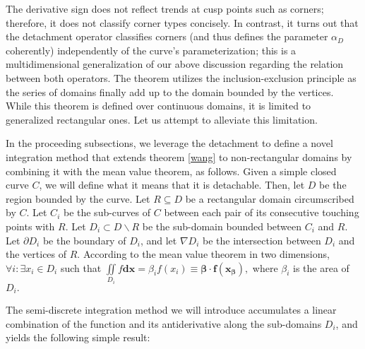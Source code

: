 \documentclass[11pt]{book}
\begin{document}
The derivative sign does not reflect trends at cusp points such as corners; therefore, it does not classify corner types concisely. In contrast, it turns out that the detachment operator classifies corners (and thus defines the parameter $\alpha_{D}$ coherently) independently of the curve’s parameterization; this is a multidimensional generalization of our above discussion regarding the relation between both operators. The theorem utilizes the inclusion-exclusion principle as the series of domains finally add up to the domain bounded by the vertices. While this theorem is defined over continuous domains, it is limited to generalized rectangular ones. Let us attempt to alleviate this limitation.

In the proceeding subsections, we leverage the detachment to define a novel integration method that extends theorem \ref{wang} to non-rectangular domains by combining it with the mean value theorem, as follows. Given a simple closed curve $C$, we will define what it means that it is detachable. Then, let $D$ be the region bounded by the curve. Let $R\subseteq D$ be a rectangular domain circumscribed by $C$. Let ${C_i}$ be the sub-curves of $C$ between each pair of its consecutive touching points with $R.$ Let $D_{i}\subset D\backslash R$ be the sub-domain bounded between $C_i$ and $R$. Let $\partial D_i$ be the boundary of $D_i$, and let $\nabla D_{i}$ be the intersection between $D_i$ and the vertices of $R$. According to the mean value theorem in two dimensions, $\forall i:\exists x_{i}\in D_{i}$ such that $\underset{{\scriptscriptstyle D_{i}}}{\iint}f\boldsymbol{dx}=\beta_{i}f\left(x_{i}\right)\equiv\boldsymbol{\beta}\cdot\boldsymbol{f\left(x_{\beta}\right)},$ where $\beta_{i}$ is the area of $D_{i}.$

The semi-discrete integration method we will introduce accumulates a linear combination of the function and its antiderivative along the sub-domains $D_{i}$, and yields the following simple result:
\end{document}
